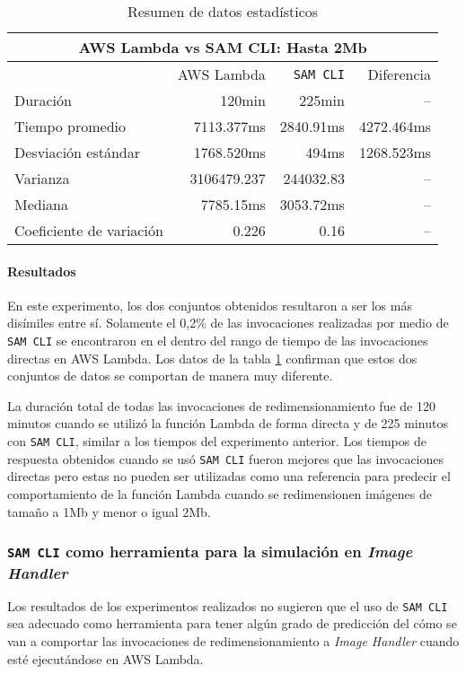 \begin{table}
    \centering
    \begin{tabular}{l|r|r|r}
        \toprule[1.5pt]
         \multicolumn{4}{c}{\textbf{AWS Lambda vs SAM CLI: Hasta 2Mb}} \\
         \midrule
         & AWS Lambda & \texttt{SAM CLI} & Diferencia \\ 
         \midrule
        Duración & 120min & 225min & -- \\
        Tiempo promedio  & 7113.377ms & 2840.91ms & 4272.464ms\\
        Desviación estándar & 1768.520ms & 494ms & 1268.523ms \\
        Varianza & 3106479.237 & 244032.83 & -- \\
        Mediana & 7785.15ms & 3053.72ms & -- \\
        Coeficiente de variación & 0.226 & 0.16 & -- \\                        
        \bottomrule[1.5pt]
    \end{tabular}
    \caption{Resumen de datos estadísticos}
    \label{table:sam-datos-estadisticos-hasta-2mb}
\end{table}

\paragraph{Resultados} En este experimento, los dos conjuntos obtenidos resultaron a ser los más disímiles entre sí. Solamente el 0,2\% de las invocaciones realizadas por medio de \texttt{SAM CLI} se encontraron en el dentro del rango de tiempo de las invocaciones directas en AWS Lambda. Los datos de la tabla \ref{table:sam-datos-estadisticos-hasta-2mb} confirman que estos dos conjuntos de datos se comportan de manera muy diferente. 

La duración total de todas las invocaciones de redimensionamiento fue de 120 minutos cuando se utilizó la función Lambda de forma directa y de 225 minutos con \texttt{SAM CLI}, similar a los tiempos del experimento anterior. Los tiempos de respuesta obtenidos cuando se usó \texttt{SAM CLI} fueron mejores que las invocaciones directas pero estas no pueden ser utilizadas como una referencia para predecir el comportamiento de la función Lambda cuando se redimensionen imágenes de tamaño a 1Mb y menor o igual 2Mb.

\subsubsection{\texttt{SAM CLI} como herramienta para la simulación en \emph{Image Handler}}
Los resultados de los experimentos realizados no sugieren que el uso de \texttt{SAM CLI} sea adecuado como herramienta para tener algún grado de predicción del cómo se van a comportar las invocaciones de redimensionamiento a \emph{Image Handler} cuando esté ejecutándose en AWS Lambda.

